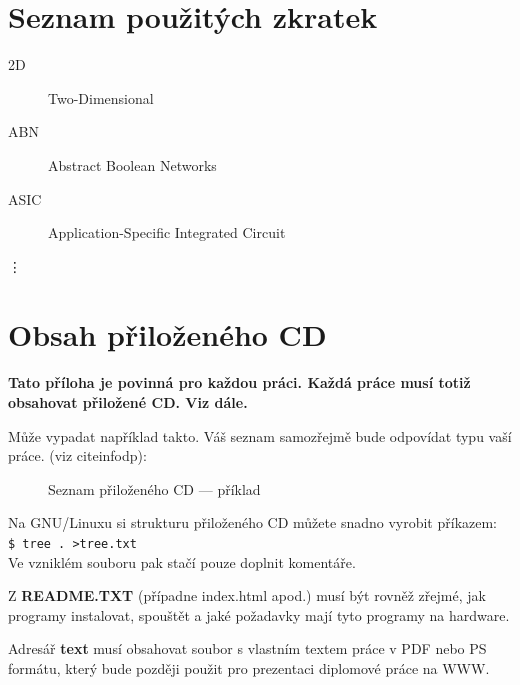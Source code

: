 \documentclass[11pt,twoside,a4paper]{book}
\begin{document}
%

\appendix


\chapter{Seznam použitých zkratek}

\begin{description}
\item[2D] Two-Dimensional
\item[ABN] Abstract Boolean Networks
\item[ASIC] Application-Specific Integrated Circuit
\end{description}
\vdots


\chapter{Obsah přiloženého CD}
\textbf{\large Tato příloha je povinná pro každou práci. Každá práce musí totiž obsahovat přiložené CD. Viz dále.}

Může vypadat například takto. Váš seznam samozřejmě bude odpovídat typu vaší práce. (viz cite{infodp}):

\begin{figure}[h]
\begin{center}
\caption{Seznam přiloženého CD --- příklad}
\end{center}
\end{figure}

Na GNU/Linuxu si strukturu přiloženého CD můžete snadno vyrobit příkazem:\\ 
\verb|$ tree . >tree.txt|\\
Ve vzniklém souboru pak stačí pouze doplnit komentáře.

Z \textbf{README.TXT} (případne index.html apod.)  musí být rovněž zřejmé, jak programy instalovat, spouštět a jaké požadavky mají tyto programy na hardware.

Adresář \textbf{text}  musí obsahovat soubor s vlastním textem práce v PDF nebo PS formátu, který bude později použit pro prezentaci diplomové práce na WWW.
\end{document}
